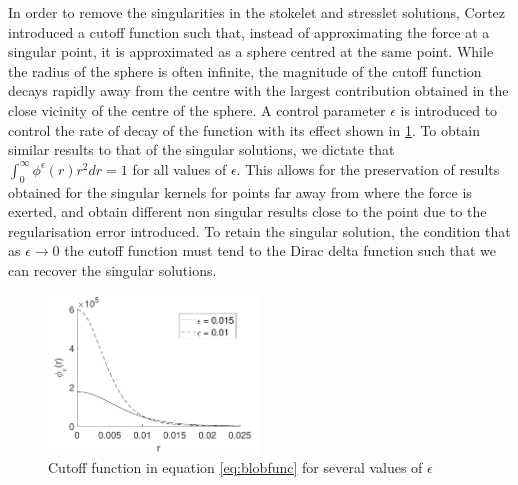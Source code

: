 In order to remove the singularities in the stokelet and stresslet solutions, Cortez \cite{Cortez2001} introduced a cutoff function such that, instead of approximating the force at a singular point, it is approximated as a sphere centred at the same point. While the radius of the sphere is often infinite, the magnitude of the cutoff function decays rapidly away from the centre with the largest contribution obtained in the close vicinity of the centre of the sphere. A  control parameter $\epsilon$ is introduced to control the rate of decay of the function with its effect shown in \cref{fig:blobfunc}. To obtain similar results to that of the singular solutions, we dictate that $\int_0^\infty \phi^\epsilon(r) r^2 dr=1$ for all values of $\epsilon$. This allows for the preservation of results obtained for the singular kernels for points far away from where the force is exerted, and obtain different non singular results close to the point due to the regularisation error introduced. To retain the singular solution, the condition that as $\epsilon \to 0$ the cutoff function must tend to the Dirac delta function such that we can recover the singular solutions.

\begin{figure}
    \centering
    \includegraphics[width=0.5\textwidth]{Images/BlobFunc.pdf}
    \caption{Cutoff function in equation \ref{eq:blobfunc} for several values of $\epsilon$}
    \label{fig:blobfunc}
\end{figure}

